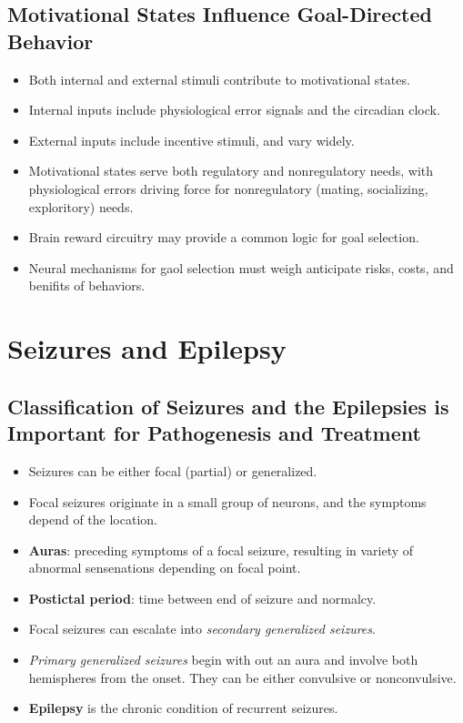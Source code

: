 \documentclass[12pt,a4paper]{article}
\begin{document}
\subsection{Motivational States Influence Goal-Directed Behavior}
\begin{itemize}
    \item Both internal and external stimuli contribute to motivational states.
    \item Internal inputs include physiological error signals and the circadian clock.
    \item External inputs include incentive stimuli, and vary widely. 
    \item Motivational states serve both regulatory and nonregulatory needs, with physiological errors driving force for nonregulatory (mating, socializing, exploritory) needs.
    \item Brain reward circuitry may provide a common logic for goal selection.
    \item Neural mechanisms for gaol selection must weigh anticipate risks, costs, and benifits of behaviors.
\end{itemize}

\clearpage
\section{Seizures and Epilepsy}
\subsection{Classification of Seizures and the Epilepsies is Important for Pathogenesis and Treatment} 
\begin{itemize}
    \item Seizures can be either focal (partial) or generalized.
    \item Focal seizures originate in a small group of neurons, and the symptoms depend of the location.
    \item \textbf{Auras}: preceding symptoms of a focal seizure, resulting in variety of abnormal sensenations depending on focal point.
    \item \textbf{Postictal period}: time between end of seizure and normalcy. 
    \item Focal seizures can escalate into \textit{secondary generalized seizures}.
    \item \textit{Primary generalized seizures} begin with out an aura and involve both hemispheres from the onset. They can be either convulsive or nonconvulsive.
    \item \textbf{Epilepsy} is the chronic condition of recurrent seizures.
\end{itemize}
\end{document}
